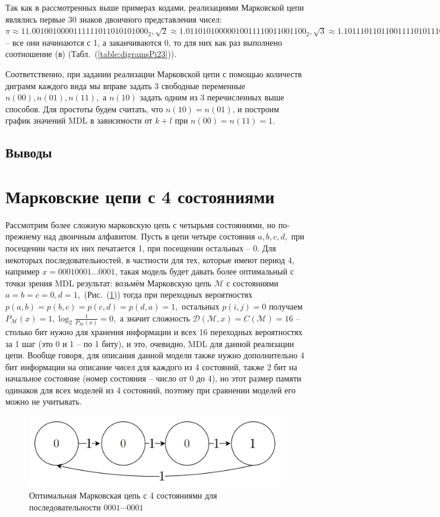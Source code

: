 \documentclass[12pt]{article}
\begin{document}
	Так как в рассмотренных выше примерах кодами, реализациями Марковской цепи являлись первые 30 знаков двоичного представления чисел: $\pi\approx11.0010010000111111011010101000_2, \sqrt{2}\approx1.01101010000010011110011001100_2,\sqrt{3}\approx1.10111011011001111010111010000$ -- все они начинаются с 1, а заканчиваются 0, то для них как раз выполнено соотношение (в) (Табл.~(\ref{table:digramsPi23})).
	
	Соответственно, при задании реализации Марковской цепи с помощью количеств диграмм каждого вида мы вправе задать 3 свободные переменные $n(00),n(01),n(11),$ а $n(10)$ задать одним из 3 перечисленных выше способов. Для простоты будем считать, что $n(10)=n(01)$, и построим график значений MDL в зависимости от $k+l$ при $n(00)=n(11)=1.$
	
	\subsection*{Выводы}

	\section{Марковские цепи с 4 состояниями}\label{chapter: M4states}
	Рассмотрим более сложную марковскую цепь с четырьмя состояниями, но по-прежнему над двоичным алфавитом. Пусть в цепи четыре состояния $a,b,c,d,$ при посещении части их них печатается 1, при посещении остальных -- 0. Для некоторых последовательностей, в частности для тех, которые имеют период 4, например $x=00010001\dots0001$, такая модель будет давать более оптимальный с точки зрения MDL результат: возьмём Марковскую цепь $\mathcal{M}$ с состояниями $a=b=c=0,d=1,$ (Рис.~(\ref{pic:M4})) тогда при переходных вероятностях $p(a,b)=p(b,c)=p(c,d)=p(d,a)=1,$ остальных $p(i,j)=0$ получаем $P_{\mathcal{M}}(x)=1,\log_2{\frac{1}{P_{\mathcal{M}}(x)}}=0,$ а значит сложность $\mathcal{D}(\mathcal{M},x)=C(\mathcal{M})=16$ -- столько бит нужно для хранения информации и всех 16 переходных вероятностях за 1 шаг (это 0 и 1 -- по 1 биту), и это, очевидно, MDL для данной реализации цепи. Вообще говоря, для описания данной модели также нужно дополнительно 4 бит информации на описание чисел для каждого из 4 состояний, также 2 бит на начальное состояние (номер состояния -- число от 0 до 4), но этот размер памяти одинаков для всех моделей из 4 состояний, поэтому при сравнении моделей его можно не учитывать. 
	
	\begin{figure}[!h]
		\caption{Оптимальная Марковская цепь с 4 состояниями для последовательности $0001\cdots0001$}
		\label{pic:M4}
		\centering
		\includegraphics[width=0.6\linewidth]{images/M4_0001.png}
	\end{figure}
	
\end{document}
